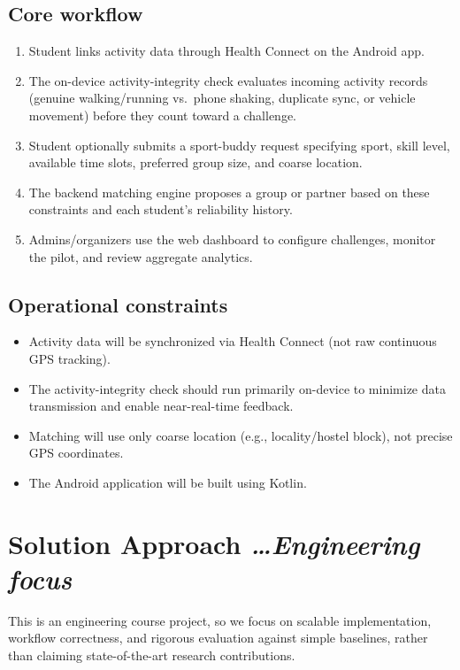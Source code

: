 \documentclass[11pt,a4paper]{article}
\newcommand{\BvrHint}[1]{%
  {\normalfont\normalsize\itshape\hfill #1}}
\begin{document}
\subsection{Core workflow}
\begin{enumerate}[leftmargin=0.7cm]
    \item Student links activity data through Health Connect on the Android app.
    \item The on-device activity-integrity check evaluates incoming activity records (genuine walking/running vs.\ phone shaking, duplicate sync, or vehicle movement) before they count toward a challenge.
    \item Student optionally submits a sport-buddy request specifying sport, skill level, available time slots, preferred group size, and coarse location.
    \item The backend matching engine proposes a group or partner based on these constraints and each student's reliability history.
    \item Admins/organizers use the web dashboard to configure challenges, monitor the pilot, and review aggregate analytics.
\end{enumerate}

\subsection{Operational constraints}
\begin{itemize}[leftmargin=0.7cm]
    \item Activity data will be synchronized via Health Connect (not raw continuous GPS tracking).
    \item The activity-integrity check should run primarily on-device to minimize data transmission and enable near-real-time feedback.
    \item Matching will use only coarse location (e.g., locality/hostel block), not precise GPS coordinates.
    \item The Android application will be built using Kotlin.
\end{itemize}

\section{Solution Approach %
\BvrHint{\ldots Engineering focus}}
This is an engineering course project, so we focus on scalable
implementation, workflow correctness, and rigorous evaluation against
simple baselines, rather than claiming state-of-the-art research
contributions.
\end{document}
